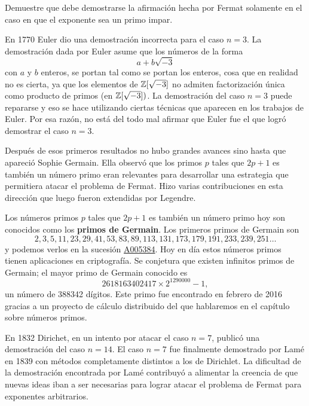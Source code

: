 
\begin{exercise}
	Demuestre que debe demostrarse la afirmación hecha por Fermat solamente en
	el caso en que el exponente sea un primo impar.
\end{exercise}

En 1770 Euler dio una demostración incorrecta para el caso $n=3$. La
demostración dada por Euler asume que los números de la forma
\[
	a+b\sqrt{-3}
\]
con $a$ y $b$ enteros, se portan tal como se portan los enteros, cosa que en
realidad no es cierta, ya que los elementos de $\mathbb{Z}[\sqrt{-3}]$ no admiten
factorización única como producto de primos (en $\mathbb{Z}[\sqrt{-3}])$. La
demostración del caso $n=3$ puede repararse y eso se hace utilizando ciertas
técnicas que aparecen en los trabajos de Euler. Por esa razón, no está del todo
mal afirmar que Euler fue el que logró demostrar el caso $n=3$. 

Después de esos primeros resultados no hubo grandes avances sino hasta que
apareció Sophie Germain. Ella observó que los primos $p$ tales que $2p+1$ es
también un número primo eran relevantes para desarrollar una estrategia que
permitiera atacar el problema de Fermat.  Hizo varias contribuciones en esta
dirección que luego fueron extendidas por Legendre. 

Los números primos $p$ tales que $2p+1$ es también un número primo hoy son
conocidos como los \textbf{primos de Germain}. 
Los primeros primos de Germain
son
\[
	2, 3, 5, 11, 23, 29, 41, 53, 83, 89, 113, 131, 173, 179, 191, 233, 239,
	251\dots
\]
y podemos verlos en la sucesión 
\href{https://oeis.org/A005384}{A005384}.
Hoy en día estos números primos
tienen aplicaciones en criptografía. Se conjetura que existen infinitos primos
de Germain; el mayor primo de Germain conocido es 
\[
	2618163402417\times 2^{1290000} - 1,
\]
un número de 388342 dígitos. Este primo fue encontrado en febrero de 2016
gracias a un proyecto de cálculo distribuido del que hablaremos en el capítulo
sobre números primos. 

En 1832 Dirichet, en un intento por atacar el caso $n=7$, publicó una
demostración del caso $n=14$. El caso $n=7$ fue finalmente demostrado por Lamé
en 1839 con métodos completamente distintos a los de Dirichlet. La dificultad
de la demostración encontrada por Lamé contribuyó a alimentar la creencia de
que nuevas ideas iban a ser necesarias para lograr atacar el problema de Fermat
para exponentes arbitrarios. 

